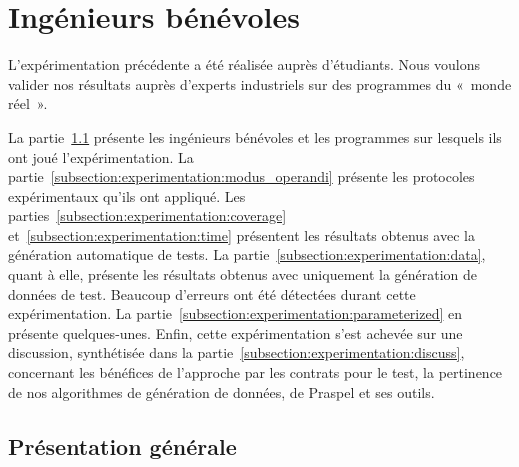 \section{Ingénieurs bénévoles}
\label{section:experimentation:real}

L'expérimentation précédente a été réalisée auprès d'étudiants. Nous voulons
valider nos résultats auprès d'experts industriels sur des programmes du «~monde
réel~».

La partie~\ref{subsection:experimentation:presentation} présente les ingénieurs
bénévoles et les programmes sur lesquels ils ont joué l'expérimentation. La
partie~\ref{subsection:experimentation:modus_operandi} présente les protocoles
expérimentaux qu'ils ont appliqué. Les
parties~\ref{subsection:experimentation:coverage}
et~\ref{subsection:experimentation:time} présentent les résultats obtenus avec
la génération automatique de tests. La
partie~\ref{subsection:experimentation:data}, quant à elle, présente les
résultats obtenus avec uniquement la génération de données de test. Beaucoup
d'erreurs ont été détectées durant cette expérimentation. La
partie~\ref{subsection:experimentation:parameterized} en présente quelques-unes.
Enfin, cette expérimentation s'est achevée sur une discussion, synthétisée dans
la partie~\ref{subsection:experimentation:discuss}, concernant les bénéfices de
l'approche par les contrats pour le test, la pertinence de nos algorithmes de
génération de données, de Praspel et ses outils.

\subsection{Présentation générale}
\label{subsection:experimentation:presentation}

